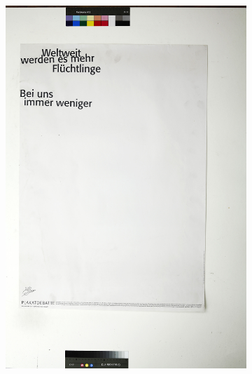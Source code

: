 \documentclass[a4paper,12pt,ngerman]{article}
\begin{document}
\newpage
\begin{figure}[ht]
	\begin{subfigure}[b]{0.5\linewidth}
	\centering
	\includegraphics[height=\linewidth, angle=90]{Abbildung_8a_(acht1_079)}
	\end{subfigure}
	\begin{subfigure}[b]{0.5\linewidth}
	\centering

\end{subfigure}
\end{figure}
\end{document}
